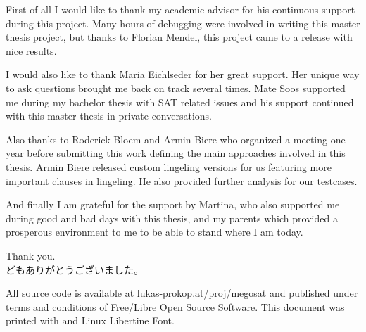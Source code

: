 \documentclass[11pt,a4paper,final,openright]{book}
\begin{document}
\begin{acknowledgements}%
  \parskip5pt
  First of all I would like to thank my academic advisor for his continuous support
  during this project. Many hours of debugging were involved in writing this
  master thesis project, but thanks to Florian Mendel, this project came to a release
  with nice results.

  I would also like to thank Maria Eichlseder for her great support. Her unique
  way to ask questions brought me back on track several times.
  Mate Soos supported me during my bachelor thesis with SAT related issues
  and his support continued with this master thesis in private conversations.

  Also thanks to Roderick Bloem and Armin Biere who organized a meeting
  one year before submitting this work defining the main approaches involved
  in this thesis. Armin Biere released custom lingeling versions for us
  featuring more important clauses in lingeling. He also provided further
  analysis for our testcases.

  And finally I am grateful for the support by Martina,
  who also supported me during good and bad days with this thesis,
  and my parents which provided a prosperous environment to me
  to be able to stand where I am today.

  Thank you. \\
  \indent どもありがとうございました。
\end{acknowledgements}

All source code is available at \href{http://lukas-prokop.at/proj/megosat}{lukas-prokop.at/proj/megosat}
and published under terms and conditions of Free/Libre Open Source Software.
This document was printed with \LuaLaTeX{} and Linux Libertine Font.


\tableofcontents
\mainmatter








\backmatter
\printindex
\printbibliography
\end{document}
